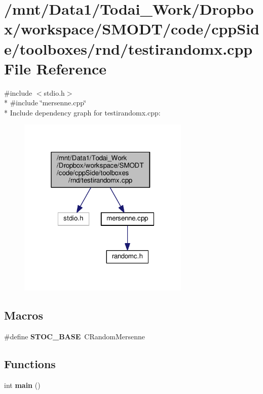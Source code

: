 \section{/mnt/\-Data1/\-Todai\-\_\-\-Work/\-Dropbox/workspace/\-S\-M\-O\-D\-T/code/cpp\-Side/toolboxes/rnd/testirandomx.cpp File Reference}
\label{toolboxes_2rnd_2testirandomx_8cpp}
{\ttfamily \#include $<$stdio.\-h$>$}\\*
{\ttfamily \#include \char`\"{}mersenne.\-cpp\char`\"{}}\\*
Include dependency graph for testirandomx.\-cpp\-:\nopagebreak
\begin{figure}[H]
\begin{center}
\leavevmode
\includegraphics[width=232pt]{toolboxes_2rnd_2testirandomx_8cpp__incl}
\end{center}
\end{figure}
\subsection*{Macros}
\begin{DoxyCompactItemize}
\item 
\#define {\bf S\-T\-O\-C\-\_\-\-B\-A\-S\-E}~C\-Random\-Mersenne
\end{DoxyCompactItemize}
\subsection*{Functions}
\begin{DoxyCompactItemize}
\item 
int {\bf main} ()
\end{DoxyCompactItemize}


